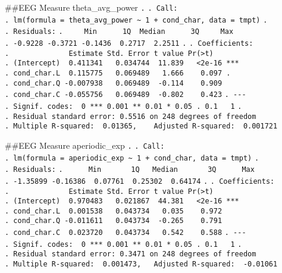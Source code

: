 \documentclass[
]{article}
\begin{document}
\#\#EEG Measure theta\_avg\_power \texttt{.} \texttt{.\ Call:}
\texttt{.\ lm(formula\ =\ theta\_avg\_power\ \textasciitilde{}\ 1\ +\ cond\_char,\ data\ =\ tmpt)}
\texttt{.} \texttt{.\ Residuals:}
\texttt{.\ \ \ \ \ Min\ \ \ \ \ \ 1Q\ \ Median\ \ \ \ \ \ 3Q\ \ \ \ \ Max}
\texttt{.\ -0.9228\ -0.3721\ -0.1436\ \ 0.2717\ \ 2.2511} \texttt{.}
\texttt{.\ Coefficients:}
\texttt{.\ \ \ \ \ \ \ \ \ \ \ \ \ \ Estimate\ Std.\ Error\ t\ value\ Pr(\textgreater{}\textbar{}t\textbar{})}
\texttt{.\ (Intercept)\ \ 0.411341\ \ \ 0.034744\ \ 11.839\ \ \ \textless{}2e-16\ ***}
\texttt{.\ cond\_char.L\ \ 0.115775\ \ \ 0.069489\ \ \ 1.666\ \ \ \ 0.097\ .}
\texttt{.\ cond\_char.Q\ -0.007938\ \ \ 0.069489\ \ -0.114\ \ \ \ 0.909}
\texttt{.\ cond\_char.C\ -0.055756\ \ \ 0.069489\ \ -0.802\ \ \ \ 0.423}
\texttt{.\ -\/-\/-}
\texttt{.\ Signif.\ codes:\ \ 0\ \textquotesingle{}***\textquotesingle{}\ 0.001\ \textquotesingle{}**\textquotesingle{}\ 0.01\ \textquotesingle{}*\textquotesingle{}\ 0.05\ \textquotesingle{}.\textquotesingle{}\ 0.1\ \textquotesingle{}\ \textquotesingle{}\ 1}
\texttt{.}
\texttt{.\ Residual\ standard\ error:\ 0.5516\ on\ 248\ degrees\ of\ freedom}
\texttt{.\ Multiple\ R-squared:\ \ 0.01365,\ \ \ \ Adjusted\ R-squared:\ \ 0.001721}

\#\#EEG Measure aperiodic\_exp \texttt{.} \texttt{.\ Call:}
\texttt{.\ lm(formula\ =\ aperiodic\_exp\ \textasciitilde{}\ 1\ +\ cond\_char,\ data\ =\ tmpt)}
\texttt{.} \texttt{.\ Residuals:}
\texttt{.\ \ \ \ \ \ Min\ \ \ \ \ \ \ 1Q\ \ \ Median\ \ \ \ \ \ \ 3Q\ \ \ \ \ \ Max}
\texttt{.\ -1.35899\ -0.16386\ \ 0.07761\ \ 0.25302\ \ 0.64174}
\texttt{.} \texttt{.\ Coefficients:}
\texttt{.\ \ \ \ \ \ \ \ \ \ \ \ \ \ Estimate\ Std.\ Error\ t\ value\ Pr(\textgreater{}\textbar{}t\textbar{})}
\texttt{.\ (Intercept)\ \ 0.970483\ \ \ 0.021867\ \ 44.381\ \ \ \textless{}2e-16\ ***}
\texttt{.\ cond\_char.L\ \ 0.001538\ \ \ 0.043734\ \ \ 0.035\ \ \ \ 0.972}
\texttt{.\ cond\_char.Q\ -0.011611\ \ \ 0.043734\ \ -0.265\ \ \ \ 0.791}
\texttt{.\ cond\_char.C\ \ 0.023720\ \ \ 0.043734\ \ \ 0.542\ \ \ \ 0.588}
\texttt{.\ -\/-\/-}
\texttt{.\ Signif.\ codes:\ \ 0\ \textquotesingle{}***\textquotesingle{}\ 0.001\ \textquotesingle{}**\textquotesingle{}\ 0.01\ \textquotesingle{}*\textquotesingle{}\ 0.05\ \textquotesingle{}.\textquotesingle{}\ 0.1\ \textquotesingle{}\ \textquotesingle{}\ 1}
\texttt{.}
\texttt{.\ Residual\ standard\ error:\ 0.3471\ on\ 248\ degrees\ of\ freedom}
\texttt{.\ Multiple\ R-squared:\ \ 0.001473,\ \ \ Adjusted\ R-squared:\ \ -0.01061}
\end{document}
